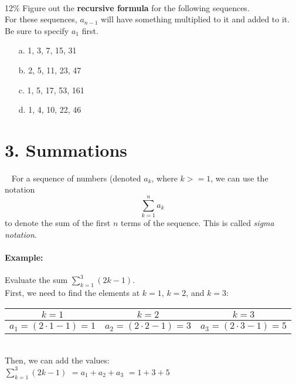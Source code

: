 \documentclass[a4paper,12pt]{book}
\begin{document}
        ~\\
        \begin{question}{8}{12\%}
            Figure out the \textbf{recursive formula} for the following sequences. \\
            For these sequences, $a_{n-1}$ will have something multiplied
            to it and added to it.
            Be sure to specify $a_{1}$ first.

            \begin{itemize}
                \item[a.] 1, 3, 7, 15, 31
                \item[b.] 2, 5, 11, 23, 47
                \item[c.] 1, 5, 17, 53, 161
                \item[d.] 1, 4, 10, 22, 46
            \end{itemize}
        \end{question}

    \newpage
    \section*{3. Summations}
        \begin{intro}{\ }
            For a sequence of numbers (denoted $a_{k}$, where $k >= 1$,
            we can use the notation
            $$\sum_{k=1}^{n} a_{k}$$
            to denote the sum of the first $n$ terms of the sequence.
            This is called \textit{sigma notation}.

            \paragraph{Example:} Evaluate the sum $\sum_{k=1}^{3}(2k-1)$. ~\\
            First, we need to find the elements at $k=1$, $k=2$, and $k=3$:

            \begin{center}
                \begin{tabular}{| c | c | c |}
                    \hline
                    \textbf{ $k=1$ } & \textbf{ $k=2$ } & \textbf{ $k=3$ } \\
                    \hline
                    $a_{1} = (2 \cdot 1 - 1) = 1$ &
                    $a_{2} = (2 \cdot 2 - 1) = 3$ &
                    $a_{3} = (2 \cdot 3 - 1) = 5$
                    \\
                    \hline
                \end{tabular}
            \end{center}
            ~\\
            Then, we can add the values: \\
            $\sum_{k=1}^{3}(2k-1) $ \tab
            $= a_{1} + a_{2} + a_{3}$ \tab
            $= 1 + 3 + 5 $ \tab
        \end{intro}
        
\end{document}
